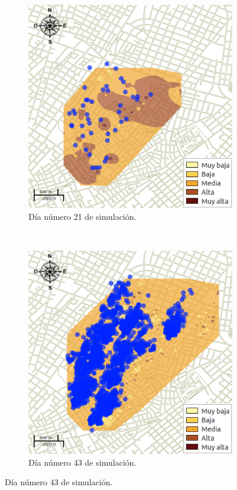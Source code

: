 \begin{figure}[!htbp]
    \begin{subfigure}[b]{0.45\textwidth}
            \includegraphics[width=\textwidth]{capitulo-6/graphics/raster/temp-34-20.png}
            \caption{\label{fig:niveles-infestacion-34-c}Día número 21 de simulación.}
    \end{subfigure}
    ~~
    \begin{subfigure}[b]{0.45\textwidth}
            \includegraphics[width=\textwidth]{capitulo-6/graphics/raster/temp-34-42.png}
            \caption{\label{fig:niveles-infestacion-34-d}Día número 43 de simulación.}
    \end{subfigure}


\end{figure}
